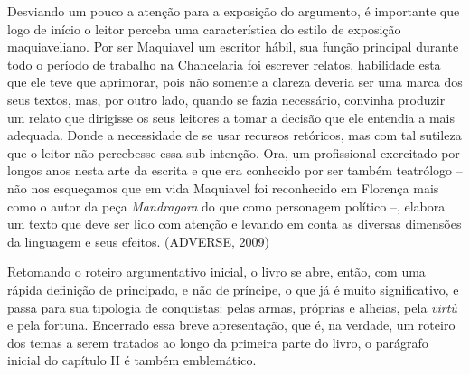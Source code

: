 Desviando um pouco a atenção para a exposição do argumento, é importante
que logo de início o leitor perceba uma característica do estilo de
exposição maquiaveliano. Por ser Maquiavel um escritor hábil, sua função
principal durante todo o período de trabalho na Chancelaria foi escrever
relatos, habilidade esta que ele teve que aprimorar, pois não somente a
clareza deveria ser uma marca dos seus textos, mas, por outro lado,
quando se fazia necessário, convinha produzir um relato que dirigisse os
seus leitores a tomar a decisão que ele entendia a mais adequada. Donde
a necessidade de se usar recursos retóricos, mas com tal sutileza que o
leitor não percebesse essa sub-intenção. Ora, um profissional exercitado
por longos anos nesta arte da escrita e que era conhecido por ser também
teatrólogo -- não nos esqueçamos que em vida Maquiavel foi reconhecido
em Florença mais como o autor da peça \emph{Mandragora} do que como
personagem político --, elabora um texto que deve ser lido com atenção e
levando em conta as diversas dimensões da linguagem e seus efeitos.
(ADVERSE, 2009)

Retomando o roteiro argumentativo inicial, o livro se abre, então, com
uma rápida definição de principado, e não de príncipe, o que já é muito
significativo, e passa para sua tipologia de conquistas: pelas armas,
próprias e alheias, pela \emph{virtù} e pela fortuna. Encerrado essa
breve apresentação, que é, na verdade, um roteiro dos temas a serem
tratados ao longo da primeira parte do livro, o parágrafo inicial do
capítulo II é também emblemático.

